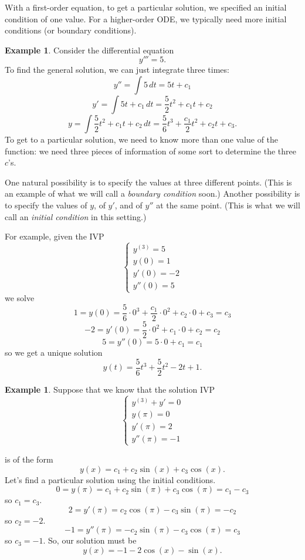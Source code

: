 \documentclass[12pt]{amsart}
\numberwithin{equation}{section}
\theoremstyle{plain} %
\theoremstyle{definition}
\newtheorem{ex}[equation]{Example}
\theoremstyle{remark}
\begin{document}
With a first-order equation, to get a particular solution, we specified an initial condition of one value.
For a higher-order ODE, we typically need more initial conditions (or boundary conditions).

\begin{ex} Consider the differential equation
\[ y''' = 5.\]
To find the general solution, we can just integrate three times:
\[ y'' = \int 5 \, dt = 5t+ c_1\]
\[ y' = \int 5t + c_1 \, dt = \frac{5}{2} t^2 + c_1 t + c_2 \]
\[ y = \int \frac{5}{2} t^2 + c_1 t + c_2 \, dt = \frac{5}{6} t^3 + \frac{c_1}{2}  t^2 + c_2 t + c_3.\]
To get to a particular solution, we need to know more than one value of the function: we need three pieces of information of some sort to determine the three $c$'s.

One natural possibility is to specify the values at three different points. (This is an example of what we will call a \emph{boundary condition} soon.) Another possibility is to specify the values of $y$, of $y'$, and of $y''$ at the same point. (This is what we will call an \emph{initial condition} in this setting.)

For example, given the IVP
\[ \begin{cases}
y^{(3)} = 5 \\
y(0)=1\\
y'(0)=-2\\
y''(0)=5\end{cases}\]
we solve
\[ 1 = y(0) = \frac{5}{6} \cdot 0^3 + \frac{c_1}{2}  \cdot0^2 + c_2 \cdot 0 + c_3 = c_3\]
\[ -2 = y'(0) = \frac{5}{2}\cdot  0^2 + c_1 \cdot 0 + c_2 = c_2\]
\[ 5 = y''(0) = 5 \cdot 0+ c_1 = c_1\]
so we get a unique solution
\[ y(t)= \frac{5}{6} t^3 + \frac{5}{2}  t^2 -2  t + 1.\]
\end{ex}

\begin{ex}
Suppose that we know that the solution IVP
\[ \begin{cases}
y^{(3)} + y' = 0 \\
y(\pi) = 0 \\
y'(\pi) = 2 \\
y''(\pi) = -1
\end{cases}\]

is of the form
\[ y(x) = c_1 + c_2 \sin(x) + c_3 \cos(x).\]
Let's find a particular solution using the initial conditions.
\[ 0 = y(\pi) = c_1 + c_2 \sin(\pi) + c_3 \cos(\pi) = c_1 - c_3\]
so $c_1=c_3$.
\[ 2 = y'(\pi) = c_2 \cos(\pi) - c_3 \sin(\pi) = -c_2\]
so $c_2=-2$.
\[ -1 = y''(\pi) = -c_2 \sin(\pi) - c_3 \cos(\pi) = c_3\]
so $c_3=-1$. So, our solution must be
\[ y(x) = -1 - 2 \cos(x) - \sin(x).\]
\end{ex}
\end{document}
